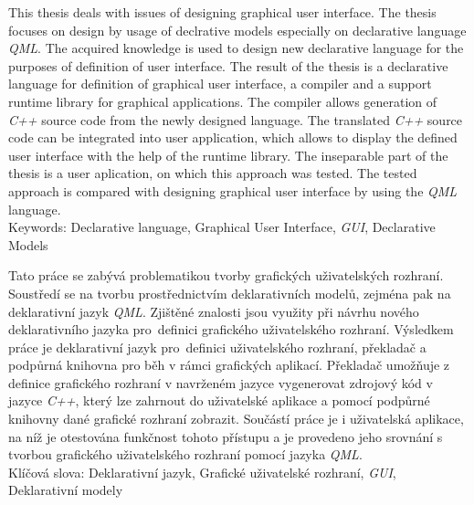 \documentclass[11pt,twoside,a4paper]{book}
\begin{document}





\abstractpage

\noindent
This thesis deals with issues of designing graphical user interface.  The thesis focuses on design by usage of declrative models especially on declarative language  \textit{QML}. The acquired knowledge is used to design new declarative language for the purposes of definition of user interface. The result of the thesis is a declarative language for definition of graphical user interface, a compiler and a support runtime library for graphical applications. The compiler allows generation of \textit{C++} source code from the newly designed language. The translated \textit{C++} source code can be integrated into user application, which allows to display the defined user interface with the help of the runtime library. The inseparable part of the thesis is a user aplication, on which this approach was tested. The tested approach is compared with designing graphical user interface by using the \textit{QML} language.\\
Keywords: Declarative language, Graphical User Interface, \textit{GUI}, Declarative Models

\baselineskip

\noindent
Tato práce se zabývá problematikou tvorby grafických uživatelských rozhraní. Soustředí se na tvorbu prostřednictvím deklarativních modelů, zejména pak na deklarativní jazyk \textit{QML}. Zjištěné znalosti jsou využity při návrhu nového deklarativního jazyka pro~definici grafického uživatelského rozhraní. Výsledkem práce je deklarativní jazyk pro~definici uživatelského rozhraní, překladač a podpůrná knihovna pro běh v rámci grafických aplikací. Překladač umožňuje z definice grafického rozhraní v navrženém jazyce vygenerovat zdrojový kód v jazyce \textit{C++}, který lze zahrnout do uživatelské aplikace a pomocí podpůrné knihovny dané grafické rozhraní zobrazit. Součástí práce je i uživatelská aplikace, na níž je otestována funkčnost tohoto přístupu a je provedeno jeho srovnání s tvorbou grafického uživatelského rozhraní pomocí jazyka \textit{QML}.\\
Klíčová slova: Deklarativní jazyk, Grafické uživatelské rozhraní, \textit{GUI}, Deklarativní modely
\end{document}

